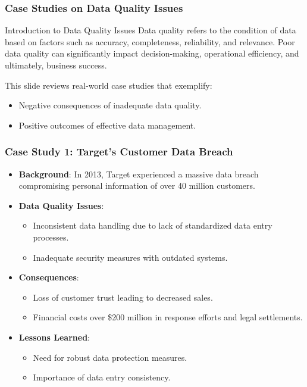 \documentclass{beamer}
\begin{document}
\begin{frame}[fragile]
    \frametitle{Case Studies on Data Quality Issues}
    \begin{block}{Introduction to Data Quality Issues}
        Data quality refers to the condition of data based on factors such as accuracy, completeness, reliability, and relevance. Poor data quality can significantly impact decision-making, operational efficiency, and ultimately, business success.
    \end{block}
    This slide reviews real-world case studies that exemplify:
    \begin{itemize}
        \item Negative consequences of inadequate data quality.
        \item Positive outcomes of effective data management.
    \end{itemize}
\end{frame}

\begin{frame}[fragile]
    \frametitle{Case Study 1: Target's Customer Data Breach}
    \begin{itemize}
        \item \textbf{Background}: In 2013, Target experienced a massive data breach compromising personal information of over 40 million customers.
        \item \textbf{Data Quality Issues}:
            \begin{itemize}
                \item Inconsistent data handling due to lack of standardized data entry processes.
                \item Inadequate security measures with outdated systems.
            \end{itemize}
        \item \textbf{Consequences}:
            \begin{itemize}
                \item Loss of customer trust leading to decreased sales.
                \item Financial costs over \$200 million in response efforts and legal settlements.
            \end{itemize}
        \item \textbf{Lessons Learned}:
            \begin{itemize}
                \item Need for robust data protection measures.
                \item Importance of data entry consistency.
            \end{itemize}
    \end{itemize}
\end{frame}
\end{document}
